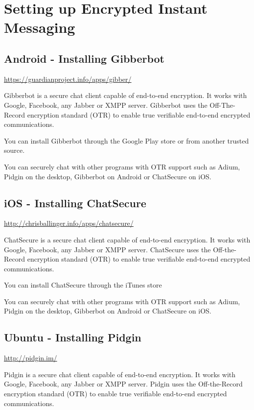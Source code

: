 \section{Setting up Encrypted Instant Messaging}

\subsection{Android - Installing Gibberbot}

\href{https://guardianproject.info/apps/gibber/}{https://guardianproject.info/apps/gibber/}

Gibberbot is a secure chat client capable of end-to-end encryption. It
works with Google, Facebook, any Jabber or XMPP server. Gibberbot uses
the Off-The-Record encryption standard (OTR) to enable true verifiable
end-to-end encrypted communications.

You can install Gibberbot through the Google Play store or from another
trusted source.

You can securely chat with other programs with OTR support such as
Adium, Pidgin on the desktop, Gibberbot on Android or ChatSecure on iOS.

\subsection{iOS - Installing ChatSecure}

\href{http://chrisballinger.info/apps/chatsecure/}{http://chrisballinger.info/apps/chatsecure/}

ChatSecure is a secure chat client capable of end-to-end encryption. It
works with Google, Facebook, any Jabber or XMPP server. ChatSecure uses
the Off-the-Record encryption standard (OTR) to enable true verifiable
end-to-end encrypted communications.

You can install ChatSecure through the iTunes store

You can securely chat with other programs with OTR support such as
Adium, Pidgin on the desktop, Gibberbot on Android or ChatSecure on iOS.

\subsection{Ubuntu - Installing Pidgin}

\href{http://pidgin.im/}{http://pidgin.im/}

Pidgin is a secure chat client capable of end-to-end encryption. It
works with Google, Facebook, any Jabber or XMPP server. Pidgin uses the
Off-the-Record encryption standard (OTR) to enable true verifiable
end-to-end encrypted communications.

